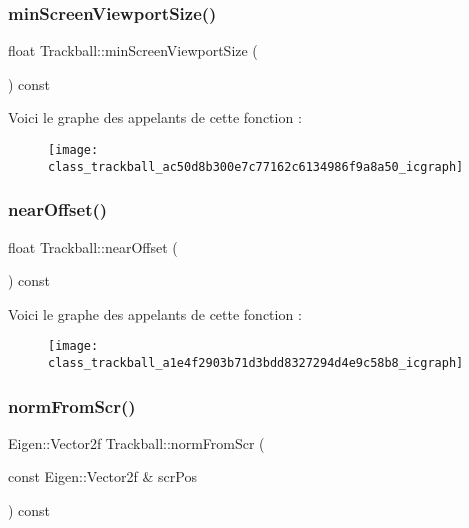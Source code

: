 \subsubsection{\texorpdfstring{min\+Screen\+Viewport\+Size()}{minScreenViewportSize()}}
{\footnotesize\ttfamily float Trackball\+::min\+Screen\+Viewport\+Size (\begin{DoxyParamCaption}{ }\end{DoxyParamCaption}) const}

Voici le graphe des appelants de cette fonction \+:\nopagebreak
\begin{figure}[H]
\begin{center}
\leavevmode
\texttt{[image: class\_trackball\_ac50d8b300e7c77162c6134986f9a8a50\_icgraph]}
\end{center}
\end{figure}
\mbox{\label{class_trackball_a1e4f2903b71d3bdd8327294d4e9c58b8}} 
\subsubsection{\texorpdfstring{near\+Offset()}{nearOffset()}}
{\footnotesize\ttfamily float Trackball\+::near\+Offset (\begin{DoxyParamCaption}{ }\end{DoxyParamCaption}) const}

Voici le graphe des appelants de cette fonction \+:\nopagebreak
\begin{figure}[H]
\begin{center}
\leavevmode
\texttt{[image: class\_trackball\_a1e4f2903b71d3bdd8327294d4e9c58b8\_icgraph]}
\end{center}
\end{figure}
\mbox{\label{class_trackball_a84d3a79355d75d73e72ca10f5d469728}} 
\subsubsection{\texorpdfstring{norm\+From\+Scr()}{normFromScr()}}
{\footnotesize\ttfamily Eigen\+::\+Vector2f Trackball\+::norm\+From\+Scr (\begin{DoxyParamCaption}\item[{const Eigen\+::\+Vector2f \&}]{scr\+Pos }\end{DoxyParamCaption}) const\hspace{0.3cm}{\ttfamily [private]}}

